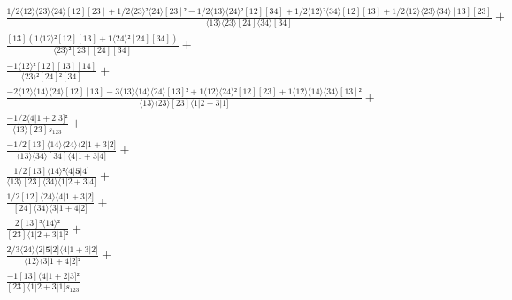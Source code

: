 \documentclass[varwidth, border=5pt]{standalone}
\begin{document}
\begin{my}
$\begin{gathered}
\scriptscriptstyle\frac{1/2⟨12⟩⟨23⟩⟨24⟩[12][23]+1/2⟨23⟩²⟨24⟩[23]²-1/2⟨13⟩⟨24⟩²[12][34]+1/2⟨12⟩²⟨34⟩[12][13]+1/2⟨12⟩⟨23⟩⟨34⟩[13][23]}{⟨13⟩⟨23⟩[24]⟨34⟩[34]} +\\
\scriptscriptstyle\frac{[13](1⟨12⟩²[12][13]+1⟨24⟩²[24][34])}{⟨23⟩²[23][24][34]} +\\
\scriptscriptstyle\frac{-1⟨12⟩²[12][13][14]}{⟨23⟩²[24]²[34]} +\\
\scriptscriptstyle\frac{-2⟨12⟩⟨14⟩⟨24⟩[12][13]-3⟨13⟩⟨14⟩⟨24⟩[13]²+1⟨12⟩⟨24⟩²[12][23]+1⟨12⟩⟨14⟩⟨34⟩[13]²}{⟨13⟩⟨23⟩[23]⟨1|2+3|1]} +\\
\scriptscriptstyle\frac{-1/2⟨4|1+2|3]²}{⟨13⟩[23]s_{123}} +\\
\scriptscriptstyle\frac{-1/2[13]⟨14⟩⟨24⟩⟨2|1+3|2]}{⟨13⟩⟨34⟩[34]⟨4|1+3|4]} +\\
\scriptscriptstyle\frac{1/2[13]⟨14⟩²⟨4|𝟓|4]}{⟨13⟩[23]⟨34⟩⟨1|2+3|4]} +\\
\scriptscriptstyle\frac{1/2[12]⟨24⟩⟨4|1+3|2]}{[24]⟨34⟩⟨3|1+4|2]} +\\
\scriptscriptstyle\frac{2[13]³⟨14⟩²}{[23]⟨1|2+3|1]²} +\\
\scriptscriptstyle\frac{2/3⟨24⟩⟨2|𝟓|2]⟨4|1+3|2]}{⟨12⟩⟨3|1+4|2]²} +\\
\scriptscriptstyle\frac{-1[13]⟨4|1+2|3]²}{[23]⟨1|2+3|1]s_{123}} \phantom{+}
\end{gathered}$
\end{my}
\end{document}
